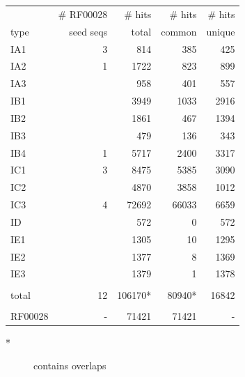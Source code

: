 \documentclass[landscape]{slides}
\begin{document}
\begin{slide}
\small
\begin{center}
\begin{tabular}{l|r|rrr}
\tt
        & \# RF00028 & \# hits   & \# hits& \# hits\\
type    & seed seqs  & total     & common & unique \\ \hline
IA1     & 3          &  814      & 385    & 425    \\
IA2     & 1          &  1722     & 823    & 899    \\
IA3     &            &   958     & 401    & 557    \\
IB1     &            &  3949     & 1033   & 2916   \\
IB2     &            & 1861     & 467    & 1394   \\
IB3     &            & 479     & 136    & 343    \\
IB4     &  1         & 5717     & 2400   & 3317   \\
IC1     &  3         & 8475     & 5385   & 3090   \\
IC2     &            & 4870     & 3858   & 1012   \\
IC3     & 4          & 72692     & 66033  & 6659   \\
ID      &            & 572     & 0      & 572    \\
IE1     &            & 1305     & 10     & 1295   \\
IE2     &            & 1377     & 8      & 1369   \\
IE3     &            & 1379     & 1      & 1378   \\
        &            &          &        &        \\
total   & 12         & 106170*   & 80940* &  16842 \\
        &           &           &        \\
RF00028 & -         & 71421     & 71421  & -      \\
\end{tabular}

\begin{description}
\item[*] contains overlaps
\end{description}


\end{center}

\vfill
\end{slide}
\end{document}
